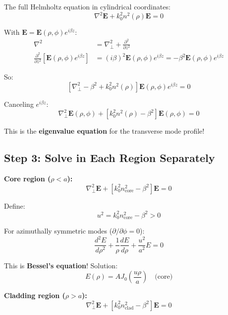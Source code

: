 \documentclass[12pt]{article}
\begin{document}
The full Helmholtz equation in cylindrical coordinates:
\begin{equation}
\nabla^2 \mathbf{E} + k_0^2 n^2(\rho) \mathbf{E} = 0
\end{equation}

With $\mathbf{E} = \mathbf{E}(\rho, \phi) e^{i\beta z}$:
\begin{align}
\nabla^2 &= \nabla_\perp^2 + \frac{\partial^2}{\partial z^2} \\
\frac{\partial^2}{\partial z^2}\left[\mathbf{E}(\rho, \phi) e^{i\beta z}\right] &= (i\beta)^2 \mathbf{E}(\rho, \phi) e^{i\beta z} = -\beta^2 \mathbf{E}(\rho, \phi) e^{i\beta z}
\end{align}

So:
\begin{equation}
\left[\nabla_\perp^2 - \beta^2 + k_0^2 n^2(\rho)\right] \mathbf{E}(\rho, \phi) e^{i\beta z} = 0
\end{equation}

Canceling $e^{i\beta z}$:
\begin{equation}
\boxed{\nabla_\perp^2 \mathbf{E}(\rho, \phi) + \left[k_0^2 n^2(\rho) - \beta^2\right] \mathbf{E}(\rho, \phi) = 0}
\end{equation}

This is the \textbf{eigenvalue equation} for the transverse mode profile!

\subsection{Step 3: Solve in Each Region Separately}

\textbf{Core region ($\rho < a$):}
\begin{equation}
\nabla_\perp^2 \mathbf{E} + \left[k_0^2 n_{\text{core}}^2 - \beta^2\right] \mathbf{E} = 0
\end{equation}

Define:
$$u^2 = k_0^2 n_{\text{core}}^2 - \beta^2 > 0$$

For azimuthally symmetric modes ($\partial/\partial\phi = 0$):
\begin{equation}
\frac{d^2 E}{d\rho^2} + \frac{1}{\rho}\frac{dE}{d\rho} + \frac{u^2}{a^2} E = 0
\end{equation}

This is \textbf{Bessel's equation}! Solution:
\begin{equation}
E(\rho) = A J_0\left(\frac{u\rho}{a}\right) \quad \text{(core)}
\end{equation}

\textbf{Cladding region ($\rho > a$):}
\begin{equation}
\nabla_\perp^2 \mathbf{E} + \left[k_0^2 n_{\text{clad}}^2 - \beta^2\right] \mathbf{E} = 0
\end{equation}
\end{document}
